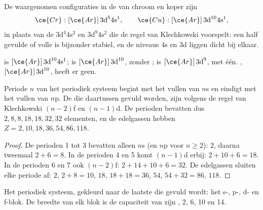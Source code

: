 \begin{proposition}\label{prop:b1:quantum-numbers:exceptions}
De waargenomen configuraties in de  van chroom en koper zijn
\[
  \ce{Cr}: [\ce{Ar}]\,3\text{d}^5 4\text{s}^1, \qquad
  \ce{Cu}: [\ce{Ar}]\,3\text{d}^{10} 4\text{s}^1 ,
\]
in plaats van de $3\text{d}^4 4\text{s}^2$ en $3\text{d}^9 4\text{s}^2$
die de regel van Klechkowski voorspelt: een half gevulde of volle
 is bijzonder stabiel, en de niveaus 4s en 3d liggen dicht bij
elkaar.
\end{proposition}


\begin{example}\label{ex:b1:quantum-numbers:copper}
 is $[\ce{Ar}]\,3\text{d}^{10} 4\text{s}^1$;  is
$[\ce{Ar}]\,3\text{d}^{10}$, zonder ;  is
$[\ce{Ar}]\,3\text{d}^9$, met één. , $[\ce{Ar}]\,3\text{d}^{10}$,
heeft er geen.
\end{example}


\begin{proposition}\label{prop:b1:quantum-numbers:table}
Periode $n$ van het periodiek systeem begint met het vullen van $n$s en
eindigt met het vullen van $n$p. De  die daartussen gevuld
worden, zijn volgens de regel van Klechkowski $(n-2)$f en $(n-1)$d. De
perioden bevatten dus $2, 8, 8, 18, 18, 32, 32$ elementen, en de
edelgassen hebben $Z = 2, 10,
18, 36, 54, 86, 118$.
\end{proposition}

\begin{proof}
De perioden 1 tot 3 bevatten alleen $n$s (en $n$p voor $n \ge 2$): $2$,
daarna tweemaal $2 + 6 = 8$. In de perioden 4 en 5 komt $(n-1)$d erbij:
$2 + 10 + 6 =
18$. In de perioden 6 en 7 ook $(n-2)$f:
$2 + 14 + 10 + 6 = 32$. De edelgassen sluiten elke periode af: $2$,
$2 + 8 = 10$, $18$, $18 + 18 = 36$, $54$, $54 + 32 = 86$, $118$.
\end{proof}

\begin{omfigure}
\omperiodictable[colour=blocks, legend]

{\small Het periodiek systeem, gekleurd naar de laatste  die
gevuld wordt: het s-, p-, d- en f-blok. De breedte van elk blok is de
capaciteit van zijn , 2, 6, 10 en 14.}
\end{omfigure}

